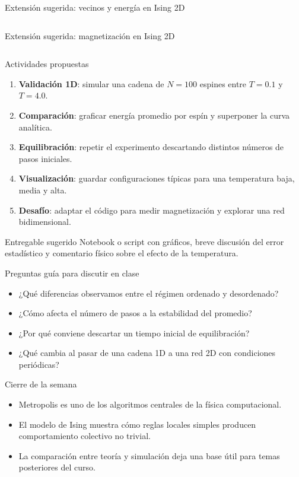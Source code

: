 \begin{frame}[fragile]{Extensión sugerida: vecinos y energía en Ising 2D}
\inputminted[firstline=13,lastline=27]{python}{ising2d.py}
\end{frame}

\begin{frame}[fragile]{Extensión sugerida: magnetización en Ising 2D}
\inputminted[firstline=36,lastline=54]{python}{ising2d.py}
\end{frame}

\begin{frame}{Actividades propuestas}
\begin{enumerate}
    \item \textbf{Validación 1D}: simular una cadena de $N=100$ espines entre $T=0.1$ y $T=4.0$.
    \item \textbf{Comparación}: graficar energía promedio por espín y superponer la curva analítica.
    \item \textbf{Equilibración}: repetir el experimento descartando distintos números de pasos iniciales.
    \item \textbf{Visualización}: guardar configuraciones típicas para una temperatura baja, media y alta.
    \item \textbf{Desafío}: adaptar el código para medir magnetización y explorar una red bidimensional.
\end{enumerate}

\begin{block}{Entregable sugerido}
Notebook o script con gráficos, breve discusión del error estadístico y comentario físico sobre el efecto de la temperatura.
\end{block}
\end{frame}

\begin{frame}{Preguntas guía para discutir en clase}
\begin{itemize}
    \item ¿Qué diferencias observamos entre el régimen ordenado y desordenado?
    \item ¿Cómo afecta el número de pasos a la estabilidad del promedio?
    \item ¿Por qué conviene descartar un tiempo inicial de equilibración?
    \item ¿Qué cambia al pasar de una cadena 1D a una red 2D con condiciones periódicas?
\end{itemize}
\end{frame}

\begin{frame}{Cierre de la semana}
\begin{itemize}
    \item Metropolis es uno de los algoritmos centrales de la física computacional.
    \item El modelo de Ising muestra cómo reglas locales simples producen comportamiento colectivo no trivial.
    \item La comparación entre teoría y simulación deja una base útil para temas posteriores del curso.
\end{itemize}
\end{frame}


